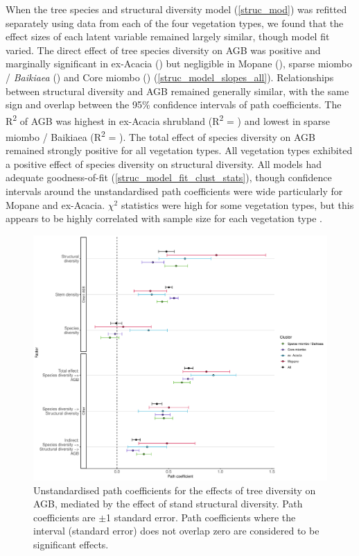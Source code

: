 \documentclass[11pt,a4paper]{article}
\begin{document}
When the tree species and structural diversity model (\autoref{struc_mod}) was refitted separately using data from each of the four vegetation types, we found that the effect sizes of each latent variable remained largely similar, though model fit varied. The direct effect of tree species diversity on AGB was positive and marginally significant in ex-Acacia (\strucbetacsb{}) but negligible in Mopane (\strucbetadsb{}), sparse miombo / \textit{Baikiaea} (\strucbetaasb{}) and Core miombo (\strucbetabsb{}) (\autoref{struc_model_slopes_all}). Relationships between structural diversity and AGB remained generally similar, with the same sign and overlap between the 95\% confidence intervals of path coefficients. The R\textsuperscript{2} of AGB was highest in ex-Acacia shrubland (R\textsuperscript{2} = \struccrsq{}) and lowest in sparse miombo / Baikiaea (R\textsuperscript{2} = \strucarsq{}). The total effect of species diversity on AGB remained strongly positive for all vegetation types. All vegetation types exhibited a positive effect of species diversity on structural diversity. All models had adequate goodness-of-fit (\autoref{struc_model_fit_clust_stats}), though confidence intervals around the unstandardised path coefficients were wide particularly for Mopane and ex-Acacia. $\chi^{2}$ statistics were high for some vegetation types, but this appears to be highly correlated with sample size for each vegetation type \citep{Hooper2008}.

\begin{figure}[H]
\centering
	\includegraphics[width=\textwidth]{struc_model_slopes_all}
	\caption{Unstandardised path coefficients for the effects of tree diversity on AGB, mediated by the effect of stand structural diversity. Path coefficients are $\pm$1 standard error. Path coefficients where the interval (standard error) does not overlap zero are considered to be significant effects.}
	\label{struc_model_slopes_all}
\end{figure}
\end{document}
